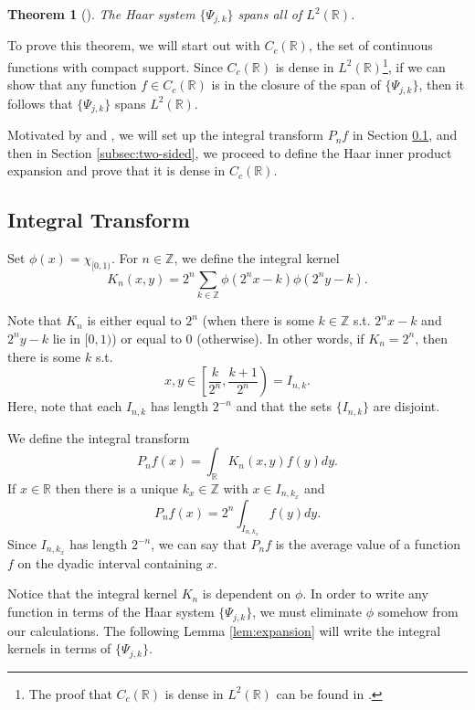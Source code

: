 \documentclass[11pt]{amsart}
\theoremstyle{theorem} %
\newtheorem{thm}{Theorem}[section] %
\theoremstyle{definition}
\theoremstyle{example}
\theoremstyle{remark}
\numberwithin{equation}{section}
\newcommand{\R}{\mathbb{R}}
\newcommand{\Z}{\mathbb{Z}}
\begin{document}
\begin{thm}[{\cite[411]{davidson}}] \label{thm:span}
	The Haar system $ \{ \varPsi_{j,k} \} $ spans all of $ L^2(\R) $.
\end{thm}

To prove this theorem, we will start out with $ C_c(\R) $, the set of continuous functions with compact support. Since $ C_c(\R) $ is dense in $ L^2(\R) $\footnote{The proof that $ C_c(\R) $ is dense in $ L^2(\R) $ can be found in \cite[326]{farrell}.}, if we can show that any function $ f \in C_c(\R) $ is in the closure of the span of $ \{\varPsi_{j,k}\} $, then it follows that $ \{ \varPsi_{j,k} \} $ spans $ L^2(\R) $.

Motivated by \cite[3]{bell} and \cite[516]{davidson}, we will set up the integral transform $ P_nf $ in Section \ref{subsec:integral transform}, and then in Section \ref{subsec:two-sided}, we proceed to define the Haar inner product expansion and prove that it is dense in $ C_c(\R) $. 

\subsection{Integral Transform} \label{subsec:integral transform}
Set $ \phi(x) = \chi_{[0,1)}$. For $ n \in \Z $, we define the integral kernel
\[ K_n (x,y) = 2^n \sum_{k \in \Z} \phi(2^n x - k) \phi(2^n y - k). \]

Note that $ K_n $ is either equal to $ 2^n $ (when there is some $ k \in \Z $ s.t. $ 2^n x-k $ and $ 2^ny - k $ lie in $ [0,1) $) or equal to 0 (otherwise). In other words, if $ K_n = 2^n $, then there is some $ k $ s.t.
\begin{equation} \label{eq:K}
	x,y \in \left[ \frac{k}{2^n}, \frac{k+1}{2^n} \right) = I_{n,k}.
\end{equation}
Here, note that each $ I_{n,k} $ has length $ 2^{-n} $ and that
the sets $ \{ I_{n,k} \} $ are disjoint.

We define the integral transform
\[ P_n f(x) = \int_{\R} K_n(x,y) f(y) dy. \]
If $ x \in \R $ then there is a unique $ k_x \in \Z $ with $ x \in I_{n, k_x} $ and
\begin{equation} \label{eq:pnf}
	P_n f(x) = 2^n \int_{I_{n,k_x}} f(y) dy.
\end{equation}
Since $ I_{n,k_x} $ has length $ 2^{-n} $, we can say that $ P_nf $ is the average value of a function $ f $ on the dyadic interval containing $ x $.

\vspace{8pt}
Notice that the integral kernel $ K_n $ is dependent on $ \phi $. In order to write any function in terms of the Haar system $ \{ \varPsi_{j,k} \} $, we must eliminate $ \phi $ somehow from our calculations. The following Lemma \ref{lem:expansion} will write the integral kernels in terms of $ \{ \varPsi_{j,k} \} $.
\end{document}
